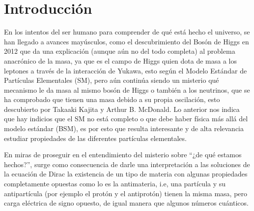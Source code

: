 \chapter{Introducción}

En los intentos del ser humano para comprender de qué está hecho el universo, se han llegado a avances mayúsculos, como el descubrimiento del Bosón de Higgs en 2012 \cite{Chatrchyan_2012} que da una explicación (aunque aún no del todo completa) al problema anacrónico de la masa, ya que es el campo de Higgs quien dota de masa a los leptones a través de la interacción de Yukawa, esto según el Modelo Estándar de Partículas Elementales (SM), pero aún continúa siendo un misterio qué mecanismo le da masa al mismo bosón de Higgs o también a los neutrinos, que se ha comprobado que tienen una masa debido a su propia oscilación, esto descubierto por Takaaki Kajita y Arthur B. McDonald. Lo anterior nos indica que hay indicios que el SM no está completo o que debe haber física más allá del modelo estándar (BSM), es por esto que resulta interesante y de alta relevancia estudiar propiedades de las diferentes partículas elementales.


En miras de proseguir en el entendimiento del misterio sobre ``¿de qué estamos hechos?'', surge como consecuencia de darle una interpretación a las soluciones de la ecuación de Dirac la existencia de un tipo de materia con algunas propiedades completamente opuestas como lo es la antimateria, i.e, una partícula y su antipartícula (por ejemplo el protón y el antiprotón) tienen la misma masa, pero carga eléctrica de signo opuesto, de igual manera que algunos números cuánticos. 

